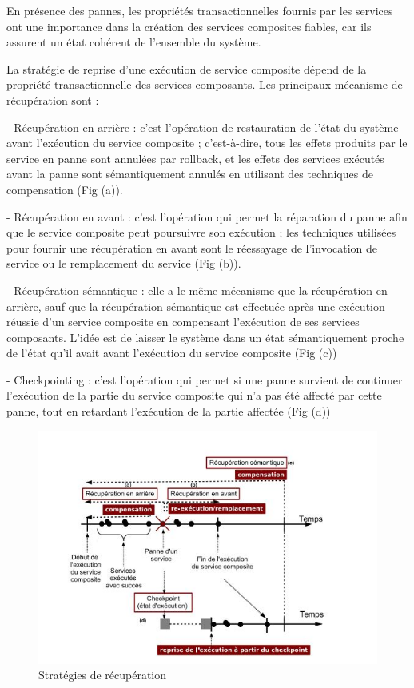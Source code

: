 En présence des pannes, les propriétés transactionnelles fournis par les services ont une importance dans la création des services composites fiables, car ils assurent un état cohérent de l'ensemble du système.

La stratégie de reprise d'une exécution de service composite dépend de la propriété transactionnelle des services composants.
Les principaux mécanisme de récupération sont \cite{1} : 

- Récupération en arrière : c'est l'opération de restauration de l’état du système avant l’exécution du service composite ; c’est-à-dire, tous les effets produits par le service en panne sont annulées par rollback, et les effets des services exécutés avant la panne sont sémantiquement annulés en utilisant des techniques de compensation (Fig (a)).


- Récupération en avant : c'est l'opération qui permet la réparation du panne afin que le  service composite peut poursuivre son exécution ; les techniques utilisées pour fournir une récupération en avant sont le réessayage de l’invocation de service ou le remplacement du service (Fig (b)).


- Récupération sémantique : elle a le même mécanisme que la récupération en arrière, sauf que la récupération sémantique est effectuée après une exécution réussie d’un service composite en compensant l’exécution de ses services composants. L’idée est de laisser le système dans un état sémantiquement proche de l’état qu’il avait avant l’exécution du service composite (Fig (c))

- Checkpointing : c'est l'opération qui permet si une panne survient de continuer l’exécution de la partie du service composite qui n’a pas été affecté par cette panne, tout en retardant l’exécution de la partie affectée (Fig (d))

\begin{figure}[H]
\begin{center}
\includegraphics[width=1\linewidth]{images/techsreparation.jpg}
\end{center}
\caption{Stratégies de récupération \cite{1}}
\label{fig:3}
\end{figure}